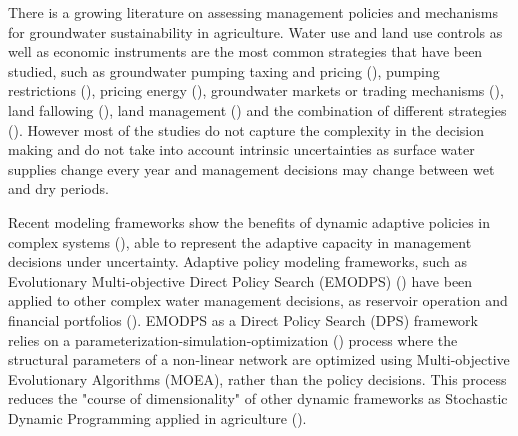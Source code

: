 \documentclass[11pt,a4paper]{article}
\begin{document}
There is a growing literature on assessing management policies and mechanisms for groundwater sustainability in agriculture. Water use and land use controls as well as economic instruments are the most common strategies that have been studied, such as groundwater pumping taxing and pricing (\cite{madani_exogenous_2013,mulligan_assessing_2014,stone_economic_2022}), pumping restrictions (\cite{young_hydrologic-economic_2021,lan_performance_2021,macewan_hydroeconomic_2017,rodriguez-flores_global_2022}), pricing energy (\cite{hrozencik_impacts_2022}), groundwater markets or trading mechanisms (\cite{khan_effect_2019,kuwayama_regulation_2013}), land fallowing (\cite{van_schmidt_linkages_2022}), land management (\cite{bourque_balancing_2019,li_evaluation_2018,bryant_shaping_2020}) and the combination of different strategies (\cite{graveline_combining_2020,hrozencik_heterogeneous_2017}). However most of the studies do not capture the complexity in the decision making  and do not take into account intrinsic uncertainties as surface water supplies change every year and management decisions may change between wet and dry periods. 

Recent modeling frameworks show the benefits of dynamic adaptive policies in complex systems (\cite{herman_climate_2020,walker_adapt_2013}), able to  represent the adaptive capacity in management decisions under uncertainty.  Adaptive policy modeling frameworks, such as Evolutionary Multi-objective Direct Policy Search (EMODPS) (\cite{giuliani_curses_2016,macian-sorribes_inferring_2019}) have been applied to other complex water management decisions, as reservoir operation and financial portfolios (\cite{zatarain_salazar_balancing_2017,gupta_can_2020}). EMODPS as a Direct Policy Search (DPS) framework relies on a parameterization-simulation-optimization (\cite{koutsoyiannis_evaluation_2003}) process where the structural parameters of a non-linear network are optimized using Multi-objective Evolutionary Algorithms (MOEA), rather than the policy decisions. This process reduces the "course of dimensionality" of other dynamic frameworks as Stochastic Dynamic Programming applied in agriculture (\cite{taylor_dynamic_1993}). 
\end{document}
